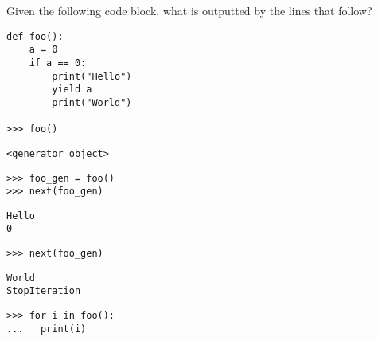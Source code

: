 \begin{blocksection}
\question Given the following code block, what is outputted by the lines that follow?

\begin{lstlisting}
def foo():
    a = 0
    if a == 0:
        print("Hello")
        yield a
        print("World")

>>> foo()
\end{lstlisting}
\begin{solution}[0.25in]
\begin{lstlisting}
<generator object>
\end{lstlisting}
\end{solution}

\begin{lstlisting}
>>> foo_gen = foo()
>>> next(foo_gen)
\end{lstlisting}

\begin{solution}[0.5in]
\begin{lstlisting}
Hello
0
\end{lstlisting}
\end{solution}

\begin{lstlisting}
>>> next(foo_gen)
\end{lstlisting}

\begin{solution}[0.5in]
\begin{lstlisting}
World
StopIteration
\end{lstlisting}
\end{solution}
\end{blocksection}

\begin{lstlisting}
>>> for i in foo():
...   print(i)
\end{lstlisting}

